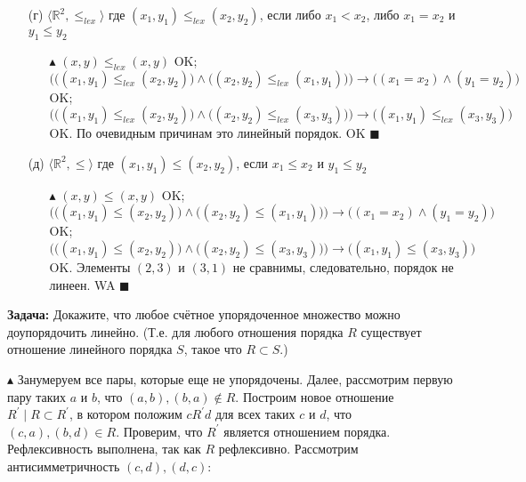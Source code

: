 \begin{enumerate}
    \item[(г)] $\langle \mathbb{R}^2, \leq_{lex} \rangle$ где $(x_1,y_1) \leq_{lex}(x_2,y_2)$, если либо $x_1 < x_2$, либо $x_1 = x_2$ и $y_1 \leq y_2$
    \begin{itemize}
        \item[$\blacktriangle$] $(x,y)  \leq_{lex}(x,y)$ {\color{ForestGreen}OK}; \quad $\Big(\big((x_1,y_1) \leq_{lex}(x_2,y_2)\big) \land \big((x_2,y_2) \leq_{lex}(x_1,y_1)\big)\Big) \to \big((x_1=x_2) \land (y_1=y_2)\big)$ {\color{ForestGreen}OK}; \quad $\Big(\big((x_1,y_1) \leq_{lex}(x_2,y_2)\big) \land \big((x_2,y_2) \leq_{lex}(x_3,y_3)\big)\Big) \to \big((x_1,y_1) \leq_{lex}(x_3,y_3)\big)$ {\color{ForestGreen}OK}.
        \newline По очевидным причинам это линейный порядок. {\color{ForestGreen}OK}  $\blacksquare$
    \end{itemize}
    
    \item[(д)] $\langle \mathbb{R}^2, \leq \rangle$ где $(x_1,y_1) \leq (x_2,y_2)$, если $x_1 \leq x_2$ и $y_1 \leq y_2$
    \begin{itemize}
        \item[$\blacktriangle$] $(x,y) \leq(x,y)$ {\color{ForestGreen}OK}; \quad $\Big(\big((x_1,y_1) \leq(x_2,y_2)\big) \land \big((x_2,y_2) \leq(x_1,y_1)\big)\Big) \to \big((x_1=x_2) \land (y_1=y_2)\big)$ {\color{ForestGreen}OK}; \quad $\Big(\big((x_1,y_1) \leq(x_2,y_2)\big) \land \big((x_2,y_2) \leq(x_3,y_3)\big)\Big) \to \big((x_1,y_1) \leq(x_3,y_3)\big)$ {\color{ForestGreen}OK}.
        \newline Элементы $(2,3)$ и  $(3,1)$ не сравнимы, следовательно, порядок не линеен. {\color{Red}WA} $\blacksquare$
    \end{itemize}
\end{enumerate}
\par \textbf{Задача:} Докажите, что любое счётное упорядоченное множество можно доупорядочить линейно. (Т.е. для любого отношения порядка $R$ существует отношение линейного порядка $S$, такое что $R \subset S$.)
\par $\blacktriangle$ Занумеруем все пары, которые еще не упорядочены. Далее, рассмотрим первую пару таких $a$ и $b$, что $(a,b),(b,a) \notin R$. Построим новое отношение $R^\prime \; | \; R \subset R^\prime$, в котором положим $cR^\prime d$ для всех таких $c$ и $d$, что $(c,a),(b,d) \in R$. Проверим, что $R^\prime$ является отношением порядка.
\newline Рефлексивность выполнена, так как $R$ рефлексивно. Рассмотрим антисимметричность $(c,d),(d,c)$:
